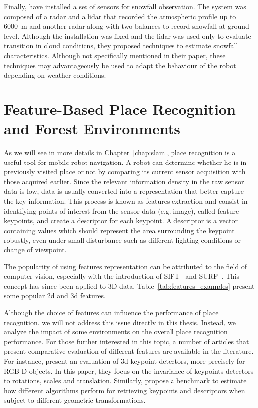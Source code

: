 Finally, \citet{servomaa2002snowfall} have installed a set of sensors for snowfall observation. The system was composed of a radar and a \gls*{lidar} that recorded the atmospheric profile up to \SI{6000}{\meter} and another radar along with two balances to record snowfall at ground level. Although the installation was fixed and the \gls*{lidar} was used only to evaluate transition in cloud conditions, they proposed techniques to estimate snowfall characteristics. Although not specifically mentioned in their paper, these techniques may advantageously be used to adapt the behaviour of the robot depending on weather conditions.  



\section{Feature-Based Place Recognition and Forest Environments}
\label{sec:literature_slam}

As we will see in more details in Chapter~\ref{chap:slam}, place recognition is a useful tool for mobile robot navigation. A robot can determine whether he is in previously visited place or not by comparing its current sensor acquisition with those acquired earlier. Since the relevant information density in the raw sensor data is low, data is usually converted into a representation that better capture the key information. This process is known as features extraction and consist in identifying points of interest from the sensor data (e.g. image), called feature keypoints, and create a descriptor for each keypoint. A descriptor is a vector containing values which should represent the area surrounding the keypoint robustly, even under small disturbance such as different lighting conditions or change of viewpoint.

The popularity of using features representation can be attributed to the field of computer vision, especially with the introduction of SIFT~\citep{Lowe2004} and SURF~\citep{Bay2006}. This concept has since been applied to 3D data. Table~\ref{tab:features_examples} present some popular \gls*{2d} and \gls*{3d} features. 

Although the choice of features can influence the performance of place recognition, we will not address this issue directly in this thesis. Instead, we analyze the impact of some environments on the overall place recognition performance. For those further interested in this topic, a number of articles that present comparative evaluation of different features are available in the literature. For instance, \citet{Filipe2014} present an evaluation of \gls*{3d} keypoint detectors, more precisely for RGB-D objects. In this paper, they focus on the invariance of keypoints detectors to rotations, scales and translation. Similarly, \citet{Boyer2011} propose a benchmark to estimate how different algorithms perform for retrieving keypoints and descriptors when subject to different geometric transformations.


